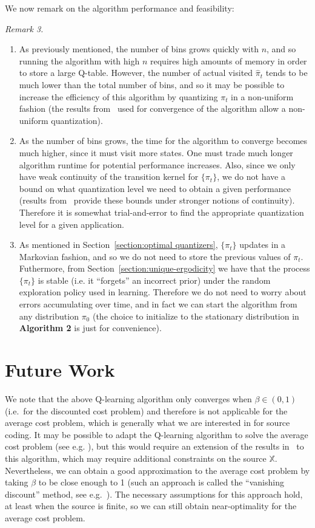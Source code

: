 \documentclass[conference]{IEEEtran}
\begin{document}
\noindent We now remark on the algorithm performance and feasibility:

\vspace{1em}
\noindent\emph{Remark 3.}\label{remark:3}
\begin{enumerate}
    \item As previously mentioned, the number of bins grows quickly with \(n\), and so running the algorithm with high \(n\) requires high amounts of memory in order to store a large Q-table. However, the number of actual visited \(\hat{\pi}_t\) tends to be much lower than the total number of bins, and so it may be possible to increase the efficiency of this algorithm by quantizing \( \pi_t \) in a non-uniform fashion (the results from~\cite{Kara} used for convergence of the algorithm allow a non-uniform quantization).
    \item As the number of bins grows, the time for the algorithm to converge becomes much higher, since it must visit more states. One must trade much longer algorithm runtime for potential performance increases. Also, since  we only have weak continuity of the transition kernel for \(\{\pi_t\}\), we do not have a bound on what quantization level we need to obtain a given performance (results from~\cite{Kara} provide these bounds under stronger notions of continuity). Therefore it is somewhat trial-and-error to find the appropriate quantization level for a given application.
    \item As mentioned in Section~\ref{section:optimal quantizers}, \(\{\pi_t\}\) updates in a Markovian fashion, and so we do not need to store the previous values of \(\pi_t\). Futhermore, from Section~\ref{section:unique-ergodicity} we have that the process \(\{\pi_t\}\) is stable (i.e. it ``forgets'' an incorrect prior) under the random exploration policy used in learning. Therefore we do not need to worry about errors accumulating over time, and in fact we can start the algorithm from any distribution \(\pi_0\) (the choice to initialize to the stationary distribution in \textbf{Algorithm 2} is just for convenience).
\end{enumerate}

\section{Future Work}
We note that the above Q-learning algorithm only converges when \( \beta \in (0,1) \) (i.e.\ for the discounted cost problem) and therefore is not applicable for the average cost problem, which is generally what we are interested in for source coding. It may be possible to adapt the Q-learning algorithm to solve the average cost problem (see e.g. \cite{Abounadi}), but this would require an extension of the results in~\cite{Kara} to this algorithm, which may require additional constraints on the source \( \mathbb{X} \). Nevertheless, we can obtain a good approximation to the average cost problem by taking \(\beta\) to be close enough to 1 (such an approach is called the ``vanishing discount'' method, see e.g.~\cite[Chapter 5]{Lerma}). The necessary assumptions for this approach hold, at least when the source is finite, so we can still obtain near-optimality for the average cost problem.
\end{document}
